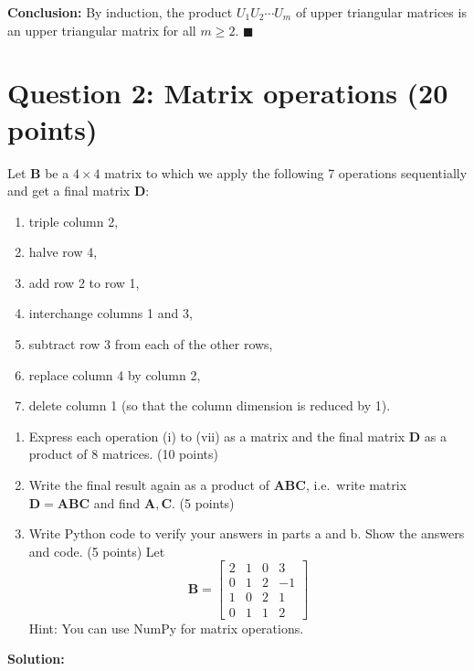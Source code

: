 \documentclass[11pt]{article}
\begin{document}
\bigskip

\noindent\textbf{Conclusion:} By induction, the product $U_1U_2\cdots U_m$ of upper triangular matrices is an upper triangular matrix for all $m \geq 2$. $\blacksquare$

\newpage
\section*{Question 2: Matrix operations (20 points)}

Let $\mathbf{B}$ be a $4\times 4$ matrix to which we apply the following 7 operations sequentially and get a final matrix $\mathbf{D}$:
\begin{enumerate}
    \item[(i)] triple column 2,
    \item[(ii)] halve row 4,
    \item[(iii)] add row 2 to row 1,
    \item[(iv)] interchange columns 1 and 3,
    \item[(v)] subtract row 3 from each of the other rows,
    \item[(vi)] replace column 4 by column 2,
    \item[(vii)] delete column 1 (so that the column dimension is reduced by 1).
\end{enumerate}
\begin{enumerate}
    \item[(a)] Express each operation (i) to (vii) as a matrix and the final matrix $\mathbf{D}$ as a product of 8 matrices. (10 points)
    \item[(b)] Write the final result again as a product of $\mathbf{ABC}$, i.e.\ write matrix $\mathbf{D} = \mathbf{ABC}$ and find $\mathbf{A},\mathbf{C}$. (5 points)
    \item[(c)] Write Python code to verify your answers in parts a and b. Show the answers and code. (5 points) Let
    \[
    \mathbf{B} = \begin{bmatrix}
        2 & 1 & 0 & 3\\
        0 & 1 & 2 & -1\\
        1 & 0 & 2 & 1\\
        0 & 1 & 1 & 2
    \end{bmatrix}
    \]
    Hint: You can use NumPy for matrix operations.
\end{enumerate}

\textbf{Solution:}
\end{document}
